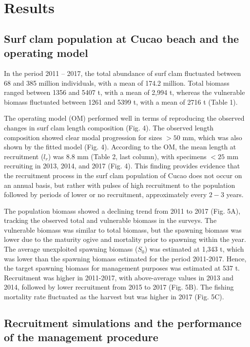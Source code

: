 \documentclass[12pt]{article}
\begin{document}
\hypertarget{results}{%
\section{Results}\label{results}}

\hypertarget{surf-clam-population-at-cucao-beach-and-the-operating-model}{%
\subsection{Surf clam population at Cucao beach and the operating
model}\label{surf-clam-population-at-cucao-beach-and-the-operating-model}}

In the period 2011 -- 2017, the total abundance of surf clam fluctuated
between 68 and 385 million individuals, with a mean of 174.2 million.
Total biomass ranged between 1356 and 5407 t, with a mean of 2,994 t,
whereas the vulnerable biomass fluctuated between 1261 and 5399 t, with
a mean of 2716 t (Table 1).

The operating model (OM) performed well in terms of reproducing the
observed changes in surf clam length composition (Fig. 4). The observed
length composition showed clear modal progression for sizes \(>50\) mm,
which was also shown by the fitted model (Fig. 4). According to the OM,
the mean length at recruitment (\(l_r\)) was 8.8 mm (Table 2, last
column), with specimens \(<25\) mm recruiting in 2013, 2014, and 2017
(Fig. 4). This finding provides evidence that the recruitment process in
the surf clam population of Cucao does not occur on an annual basis, but
rather with pulses of high recruitment to the population followed by
periods of lower or no recruitment, approximately every \(2-3\) years.

The population biomass showed a declining trend from 2011 to 2017 (Fig.
5A), tracking the observed total and vulnerable biomass in the surveys.
The vulnerable biomass was similar to total biomass, but the spawning
biomass was lower due to the maturity ogive and mortality prior to
spawning within the year. The average unexploited spawning biomass
(\(S_0\)) was estimated at 1,343 t, which was lower than the spawning
biomass estimated for the period 2011-2017. Hence, the target spawning
biomass for management purposes was estimated at 537 t. Recruitment was
higher in 2011-2017, with above-average values in 2013 and 2014,
followed by lower recruitment from 2015 to 2017 (Fig. 5B). The fishing
mortality rate fluctuated as the harvest but was higher in 2017 (Fig.
5C).

\hypertarget{recruitment-simulations-and-the-performance-of-the-management-procedure}{%
\subsection{Recruitment simulations and the performance of the
management
procedure}\label{recruitment-simulations-and-the-performance-of-the-management-procedure}}
\end{document}
